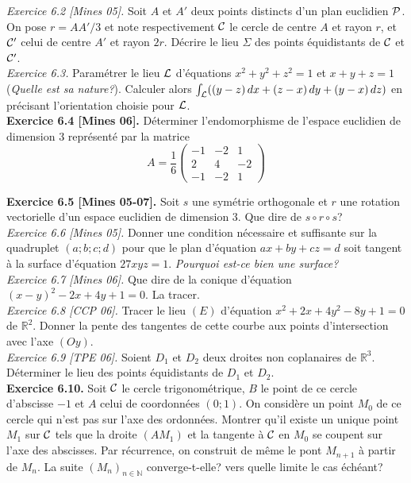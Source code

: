 \documentclass[a4paper,12pt,francais]{article}
\newcommand{\field}[1]{\mathbb{#1}}
\newcommand{\N}{\field{N}}
\newcommand{\R}{\field{R}}
\begin{document}
\noindent
{\it Exercice 6.2 [Mines 05].} Soit $A$ et $A'$ deux points distincts
d'un plan euclidien $\cal{P}$. On pose $r=AA'/3$ et note
respectivement $\cal{C}$ le cercle de centre $A$ et rayon $r$, et 
$\cal{C}'$ celui de centre $A'$ et rayon $2r$. Décrire le lieu
$\Sigma$ des
points équidistants de $\cal{C}$ et $\cal{C'}$.\\

\noindent
{\it Exercice 6.3.} Paramétrer le lieu $\cal{L}$ d'équations
  $x^2+y^2+z^2=1$ et $x+y+z=1$ ({\it Quelle est sa nature?}). Calculer
  alors $\int_{\cal{L}} ((y-z)\,dx+(z-x)\,dy+(y-x)\, dz)$ en précisant
  l'orientation choisie pour $\cal{L}$.\\

\noindent
{\bf Exercice 6.4 [Mines 06].} Déterminer l'endomorphisme de l'espace
euclidien de dimension $3$ représenté par la matrice
$$A=\frac{1}{6}
\left(
\begin{array}{ccc}
-1&-2&1\\
2&4&-2\\
-1&-2&1
\end{array}
\right)$$

\noindent
{\bf Exercice 6.5 [Mines 05-07].} Soit $s$ une symétrie orthogonale et $r$
une rotation vectorielle d'un espace euclidien de dimension $3$. Que
dire de $s\circ r \circ s$?\\

\noindent
{\it Exercice 6.6 [Mines 05].} Donner une condition nécessaire et
suffisante sur la quadruplet $(a;b;c;d)$ pour que le plan d'équation
$ax+by+cz=d$ soit tangent à la surface d'équation $27 xyz=1$. {\it
  Pourquoi est-ce bien une surface?}\\

\noindent
{\it Exercice 6.7 [Mines 06].} Que dire de la conique d'équation
$(x-y)^2-2x+4y+1=0$. La tracer.\\

\noindent
{\it Exercice 6.8 [CCP 06].} Tracer le lieu $(E)$ d'équation $x^2+2x+4y^2-8y+1=0$ de $\R^2$. Donner la pente des tangentes de cette courbe aux points d'intersection avec l'axe $(Oy)$.\\

\noindent
{\it Exercice 6.9 [TPE 06].} Soient $D_1$ et $D_2$ deux droites non coplanaires de $\R^3$. Déterminer le lieu des points équidistants de $D_1$ et $D_2$.\\

\noindent
{\bf Exercice 6.10.} Soit $\cal{C}$ le cercle trigonométrique, $B$ le point de ce cercle d'abscisse $-1$ et $A$ celui de coordonnées $(0;1)$. On considère un point $M_0$ de ce cercle qui n'est pas sur l'axe des ordonnées. Montrer qu'il existe un unique point $M_1$ sur $\cal{C}$ tels que la droite $(AM_1)$ et la tangente à $\cal{C}$ en $M_0$ se coupent sur l'axe des abscisses. Par récurrence, on construit de même le pont $M_{n+1}$ à partir de $M_n$. La suite $(M_n)_{n \in \N}$ converge-t-elle? vers quelle limite le cas échéant?\\
\end{document}
